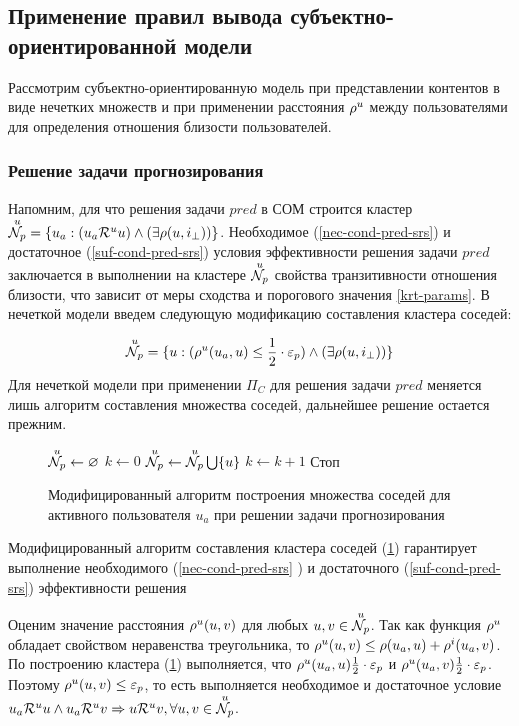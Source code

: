 \subsection{Применение правил вывода субъектно-ориентированной модели}
Рассмотрим субъектно-ориентированную модель при представлении контентов в виде
нечетких множеств и при применении расстояния ${\mathcal{\rho}}^u$ между пользователями для определения
отношения близости пользователей.
\subsubsection{Решение задачи прогнозирования}
Напомним, для что решения задачи $pred$ в СОМ
строится кластер
${\overset{u}{\mathcal{N}_p}} = \{ u_a : (u_a \mathcal{R}^u u) \wedge (\exists \rho(u, i_{\bot})) \}$.
Необходимое (\ref{nec-cond-pred-srs}) и достаточное (\ref{suf-cond-pred-srs})
условия эффективности решения задачи $pred$
заключается в выполнении на кластере ${\overset{u}{\mathcal{N}_p}}$ свойства
транзитивности отношения близости,
что зависит от меры сходства и порогового значения \ref{krt-params}.
В нечеткой модели введем следующую модификацию составления
кластера соседей:

\begin{equation}
	\label{mod-of-p-ub}
	{\overset{u}{\mathcal{N}_p}} = \{ u : ({\mathcal{\rho}}^u(u_a, u) \le \frac{1}{2} \cdot \varepsilon_p) \wedge
	(\exists \rho(u, i_{\bot})) \}
\end{equation}
Для нечеткой модели при применении $\Pi_C$ для решения задачи
$pred$ меняется лишь алгоритм составления множества соседей, дальнейшее решение остается прежним.

\begin{figure}[h]
	\caption{Модифицированный алгоритм построения множества соседей для активного
	пользователя $u_a$ при решении задачи прогнозирования}
	\label{alg-mod-up1}
		\begin{algorithmic}[1]
			\State ${\overset{u}{\mathcal{N}_p}} \gets \varnothing$
			\State $k \gets 0$
			\State ${\overset{u}{\mathcal{N}_p}} \gets {\overset{u}{\mathcal{N}_p}} \bigcup \{ u \}$
			\State $k \gets k + 1$
			\EndIf
			\State Стоп
			\EndIf
			\EndFor
		\end{algorithmic}
\end{figure}

\begin{trm}
	\label{trm:fuz-eff-com}
	Модифицированный алгоритм составления кластера соседей
	(\ref{alg-mod-up1})
	гарантирует выполнение необходимого (\ref{nec-cond-pred-srs}
) и
	достаточного (\ref{suf-cond-pred-srs})
эффективности решения
		\end{trm}
Оценим значение расстояния ${\mathcal{\rho}}^u(u, v)$ для любых $u,v \in {\overset{u}{\mathcal{N}_p}}$.
Так как функция ${\mathcal{\rho}}^u$ обладает свойством неравенства треугольника, то
${\mathcal{\rho}}^u(u, v) \le \rho(u_a, u) + {\mathcal{\rho}}^i(u_a, v)$. По построению кластера
(\ref{alg-mod-up1}) выполняется, что
${\mathcal{\rho}}^u(u_a, u) \frac{1}{2} \cdot \varepsilon_p$
и
${\mathcal{\rho}}^u(u_a, v) \frac{1}{2} \cdot \varepsilon_p$. Поэтому ${\mathcal{\rho}}^u(u,v) \le
\varepsilon_p$, то есть выполняется
необходимое и достаточное условие
$u_a \mathcal{R}^u u \wedge u_a \mathcal{R}^u v  \Rightarrow u \mathcal{R}^u v, \forall u,v \in {\overset{u}{\mathcal{N}_p}}$.

